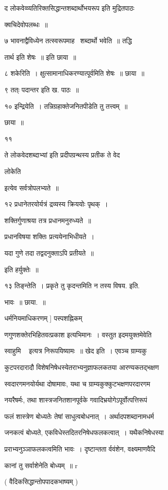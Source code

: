 \documentclass[11pt, openany]{book}
\begin{document}
द {\qt लोकवेव्व्यतिरिक्तसिद्धान्तशब्दार्थोभयरूप} इति मुद्रितपाठः 

क्वचिदेवोपलब्धः~॥ 

७ भावनाद्वैविध्येन तत्स्वरूपमाह \textendash\ शब्दार्थो भवेति~॥ तद्धि \textendash\ 

तार्थ इति शेषः~॥ इति छाया~॥ 

८ शकेरिति~। क्षुत्सामानाधिकरण्यात्पूर्वमिति शेषः~॥ छाया~॥ 

९ {\qt तत्ः पदान्तर} इति ख. पाठः~॥ 

१० इन्द्रियेति~। तन्निग्रहाक्तेजनितपीडेति तु तत्त्वम्~॥ 

छाया~॥ 

११ {\qt ते लोकवेदशब्दाभ्यां इति प्रदीपग्रन्थस्य प्रतीक ते वेद \textendash\ 

लोकेति} इत्येव सर्वत्रोपलभ्यते~॥ 

१२ प्रधानेतरयोर्यत्रं द्रव्यस्य क्रिययोः पृथक्~। 

शक्तिर्गुणाश्रया तत्र प्रधानमनुरुध्यते~॥ 

प्रधानविषया शक्तिः प्रत्ययेनाभिधीयते~। 

यदा गुणे तदा तद्वदनुक्ताऽपि प्रतीयते~॥ 

इति हर्युक्तेः~॥ 

१३ तिङ्न्तेति~। प्रकृते तु कृदन्तमिति न तस्य विषय. इति. 

भावः~॥ छाया.~॥ 

धर्मनियमाधिकरणम् ] पस्पशह्निकम् 



णगुणशक्तेरभिहितवत्प्रकाश इत्यभिमानः~। वस्तुत इदमयुक्तमेवेति 

{\qt स्वाहुमि \textendash\ } इत्यत्र निरूपयिष्यामः~॥ खेद इति~। एवञ्च ग्राम्यकु \textendash\ 

कुटपरदारादौ विशेषनिषेधस्येतराभ्यनुज्ञाफलकतया आरण्यकतद्भक्षण \textendash\ 

स्वदारगमनयोर्यथा दोषामावः, यथा च ग्राम्यकुक्कुटभक्षणपरदारगम \textendash\ 

नयरैषर्मः, तथा शास्त्रजनितशानपूर्वके गवादिभ्रयोगेऽपूर्वोत्पत्तिरूपं 

फलं शास्त्रेण बोध्यतेः तेषां साधुत्वबोधनात्~। अर्थादपशब्दानामधर्म \textendash\ 

जनकत्वं बोध्यते, एकविधेस्तदितरनिषेधफलकत्वात्~। यथैकनिषेधस्या \textendash\ 

प्रराभ्यनुञ्ञाफलकत्वमिति भावः~। दृष्टान्तता र्ववंशेन, वक्ष्यमाणवैदि \textendash\ 

कानां तु सर्वाशेनेति बोध्यम्~॥ r 

( वैदिकसिद्धान्तोपपादकभाष्यम् ) 
\end{document}
